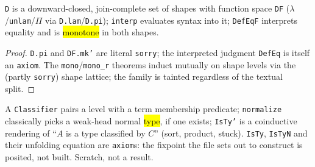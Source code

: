 \begin{lemma}
\label{family:expb-thierry2-model}
\leanok
{}

 \texttt{D} is a downward-closed, join-complete set of shapes with function space
\texttt{DF} ($\lambda$/\texttt{unlam}/$\Pi$ via \texttt{D.lam}/\texttt{D.pi}); \texttt{interp}
evaluates syntax into it; \texttt{DefEqF} interprets equality and is \hl{monotone} in both shapes.
\end{lemma}
\begin{proof}
\stSorry{} \texttt{D.pi} and \texttt{DF.mk'} are literal \texttt{sorry}; the interpreted judgment
\texttt{DefEq} is itself an \texttt{axiom}.
 The \texttt{mono}/\texttt{mono\_r} theorems induct mutually on shape levels via the
(partly \texttt{sorry}) shape lattice; the family is tainted regardless of the textual split.
\end{proof}

\begin{definition}
\label{family:expb-stepindexed}
\leanok
{}

 A \texttt{Classifier} pairs a level with a term membership predicate;
\texttt{normalize} classically picks a weak-head normal \hl{type}, if one exists; \texttt{IsTy'} is
a coinductive rendering of ``$A$ is a type classified by $C$'' (sort, product, stuck).
 \texttt{IsTy}, \texttt{IsTyN} and their unfolding equation are \texttt{axiom}s: the
fixpoint the file sets out to construct is posited, not built. Scratch, not a result.
\end{definition}

